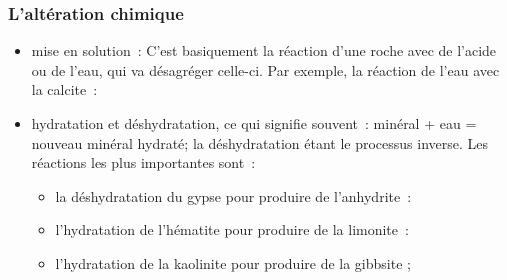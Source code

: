 \documentclass[a4paper,11pt]{article}
\begin{document}
\subsubsection{L'altération chimique}
\begin{itemize}
  \item mise en solution~: C'est basiquement la réaction d'une roche avec de l'acide ou de l'eau, qui va désagréger celle-ci.
  Par exemple, la réaction de l'eau avec la calcite~:
  \medbreak
  \begin{center}
  \end{center}
  \medbreak
  \item hydratation et déshydratation, ce qui signifie souvent~: minéral + eau = nouveau minéral hydraté; la déshydratation étant le processus inverse.
  Les réactions les plus importantes sont~:
  \begin{itemize}
    \item la déshydratation du gypse pour produire de l'anhydrite~:
    \medbreak
    \begin{center}
    \end{center}
    \medbreak
    \item l'hydratation de l'hématite pour produire de la limonite~:
    \medbreak
    \begin{center}
    \end{center}
    \medbreak
    \item l'hydratation de la kaolinite pour produire de la gibbsite ;
  \end{itemize}


\end{itemize}
\end{document}
